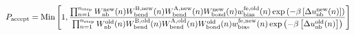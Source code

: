 \documentclass[12pt]{article}
\begin{document}
\begin{displaymath}
P_{\rm accept} = {\rm Min}\left[1,
{
{\prod_{n=1}^{n_{\rm step}} 
W_{\rm nb}^{\rm new}(n)
W_{\rm bend}^{\rm B, new}(n)
W_{\rm bend}^{\rm A, new}(n)
W_{\rm bond}^{\rm new}(n)
w_{\rm bias}^{\rm fe, old}(n)
\exp\left(-\beta\left[\Delta u_{\rm nb}^{\rm new}(n)\right]\right)
}
\over
{\prod_{n=1}^{n_{\rm step}}
W_{\rm nb}^{\rm old}(n)
W_{\rm bend}^{\rm B, old}(n)
W_{\rm bend}^{\rm A, old}(n)
W_{\rm bond}^{\rm old}(n)
w_{\rm bias}^{\rm fe, new}(n)
\exp\left(-\beta\left[\Delta u_{\rm nb}^{\rm old}(n)\right]\right)
}
}
\right]
\end{displaymath}
\end{document}
